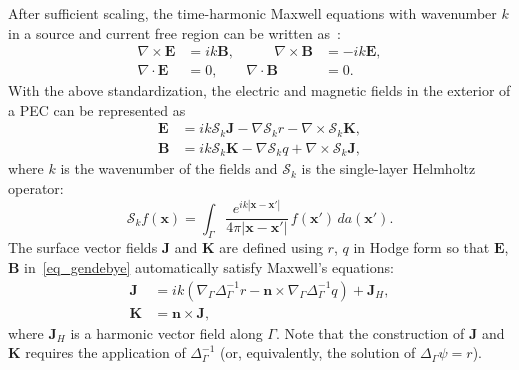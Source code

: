 \documentclass[11pt]{article}
\newcommand{\surfgrad}{\nabla_\Gamma}
\newcommand{\surflap}{\Delta_\Gamma}
\newcommand{\bn}{\bm n}
\newcommand{\bx}{\bm x}
\newcommand{\bB}{\bm B}
\newcommand{\bE}{\bm E}
\newcommand{\bJ}{\bm J}
\newcommand{\bK}{\bm K}
\newcommand{\cS}{\mathcal S}
\numberwithin{equation}{section}
\begin{document}
After sufficient scaling,
the time-harmonic Maxwell equations with wavenumber $k$ in a
source and current free region can be written as~\cite{papas}:
\begin{equation}
  \begin{aligned}\label{eq_maxwell}
  \nabla \times \bE &= ik \bB, &\qquad \nabla \times \bB &= -ik \bE,\\
  \nabla \cdot \bE &= 0, &   \nabla \cdot \bB &= 0.
  \end{aligned}
\end{equation}
With the above standardization, the 
electric and magnetic fields in the exterior of a PEC can be
represented
as
\begin{equation}\label{eq_gendebye}
\begin{aligned}
  \bE &= ik \cS_k \bJ - \nabla \cS_k r - \nabla \times \cS_k \bK, \\
  \bB &= ik \cS_k \bK - \nabla \cS_k q + \nabla \times \cS_k \bJ,
\end{aligned}
\end{equation}
where $k$ is the wavenumber of the fields
 and $\cS_k$ is the single-layer Helmholtz
operator:
\begin{equation}
\cS_k f (\bx) =  \int_\Gamma \frac{e^{ik|\bx-\bx'|}}{4\pi |\bx-\bx'|} 
\, f(\bx') \, da(\bx') .
\end{equation} 
The surface vector fields $\bJ$ and $\bK$ are defined using $r$, $q$
in Hodge form
so that $\bE$, $\bB$ in~\eqref{eq_gendebye}
automatically satisfy Maxwell's equations:
\begin{equation}
\begin{aligned}
\bJ &=  ik \left(\surfgrad \surflap^{-1} r - \bn \times \surfgrad
  \surflap^{-1} q  \right) + \bJ_H ,\\
\bK &= \bn \times \bJ,
\end{aligned}
\end{equation}
where $\bJ_H$ is a harmonic vector field along $\Gamma$.
Note that the construction of $\bJ$ and $\bK$ requires the application
of $\surflap^{-1}$ (or, equivalently, the solution of $\surflap \psi = r$).
\end{document}
